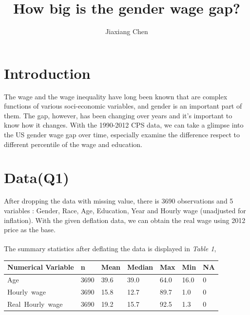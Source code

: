 \documentclass{article}
\title{\textbf{How big is the gender wage gap?}}
\author{Jiaxiang Chen}
\date{}
\begin{document}
\maketitle


\section{Introduction}
The wage and the wage inequality have long been known that are complex functions of various soci-economic variables, and gender is an important part of them. The gap, however, has been changing over years and it's important to know how it changes. With the 1990-2012 CPS data, we can take a glimpse into the US gender wage gap over time, especially examine the difference respect to different percentile of the wage and education.


\section{Data(Q1)}
After dropping the data with missing value, there is 3690 observations and 5 variables : Gender, Race, Age, Education, Year and Hourly wage (unadjusted for inflation). With the given deflation data, we can obtain the real wage using 2012 price as the base.
\\~\\
The summary statistics after deflating the data is displayed in \textit{Table 1},\\

\begin{minipage}{\linewidth}
\centering
\captionsetup{labelfont=bf}
\label{tab:title}
\begin{tabularx}{\textwidth}{ C{1.25in} C{.85in} *5{C{.75in}}}\toprule[1.5pt]
 \textbf{Numerical Variable} & \textbf{n} & \textbf{Mean} & \textbf{Median} & \textbf{Max} & \textbf{Min} & \textbf{NA}  \\ 
  \hline 
\hline
  Age & 3690 &   39.6 &   39.0 &   64.0 &   16.0& 0 \\ 
  Hourly\ wage & 3690 &   15.8 &   12.7 &   89.7 &    1.0& 0 \\ 
  Real\ Hourly\ wage & 3690 &   19.2 &   15.7 &   92.5 &    1.3& 0 \\ 
  \hline
\end{tabularx}\par
\end{minipage}
\bigskip
\end{document}
